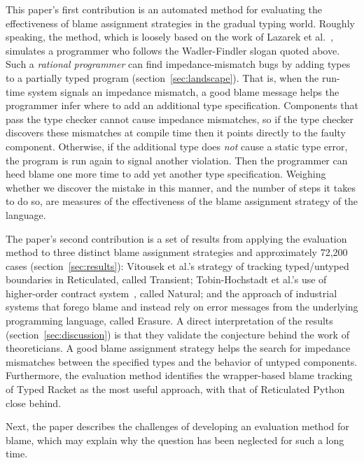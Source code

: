 This paper's first contribution is an automated method for evaluating the
effectiveness of blame assignment strategies in the gradual typing world.
Roughly speaking, the method, which is
loosely based on the work of Lazarek et al.~\cite{lksfd-popl-2020},
simulates a programmer who follows the Wadler-Findler slogan quoted above.
Such a \emph{rational programmer} can find impedance-mismatch
bugs by adding types to a partially typed program (section~\ref{sec:landscape}). That is, when the
run-time system signals an impedance mismatch, a good blame message helps
the programmer infer where to add an additional type specification.
Components that pass the type checker cannot cause impedance mismatches,
so if the type checker discovers these mismatches at compile time then it points
directly to the faulty component. Otherwise, if the
additional type does {\em not\/} cause a static type error, the program
is run again to signal another violation. Then the programmer can heed
blame one more time to add yet another type specification.
Weighing whether we discover the mistake in this manner, and the number of
steps it takes to do so, are measures of the effectiveness
of the blame assignment strategy of the language.

The paper's second contribution is a set of results from applying the evaluation
method to three distinct blame assignment strategies and approximately
72,200 cases (section~\ref{sec:results}): Vitousek et
al.'s strategy of tracking typed/untyped boundaries in Reticulated, called Transient;
Tobin-Hochstadt et al.'s use of higher-order contract system~\cite{ff-icfp-2002,
mf-toplas-2009}, called Natural; and the approach of industrial systems that forego blame
and instead rely on error messages from the
underlying programming language, called Erasure. A direct interpretation of the results
(section~\ref{sec:discussion}) is that
they validate the conjecture behind the work of theoreticians. A good blame assignment
strategy helps the search for impedance mismatches between the specified types
and the behavior of untyped components.
Furthermore, the evaluation method
identifies the wrapper-based blame tracking of Typed Racket as the most
useful approach, with that of Reticulated Python close behind.

Next, the paper describes the challenges of developing an evaluation
method for blame, which may explain why the question has been neglected for such
a long time.


